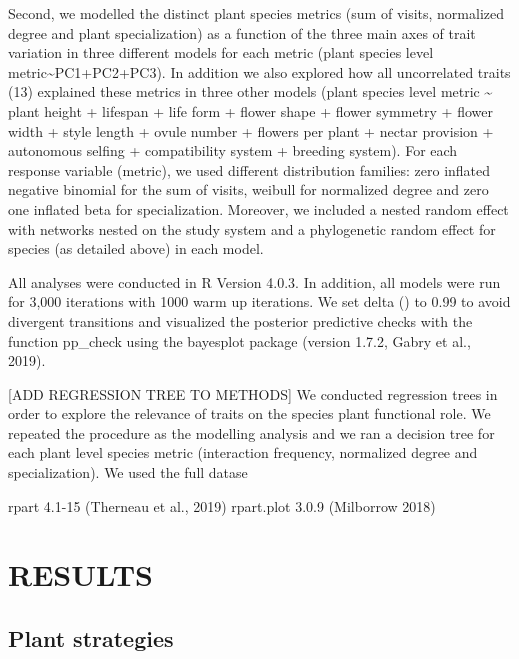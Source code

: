 \documentclass[12pt,a4paper,]{article}
\begin{document}
Second, we modelled the distinct plant species metrics (sum of visits,
normalized degree and plant specialization) as a function of the three
main axes of trait variation in three different models for each metric
(plant species level metric\textasciitilde{}PC1+PC2+PC3). In addition we
also explored how all uncorrelated traits (13) explained these metrics
in three other models (plant species level metric \textasciitilde{}
plant height + lifespan + life form + flower shape + flower symmetry +
flower width + style length + ovule number + flowers per plant + nectar
provision + autonomous selfing + compatibility system + breeding
system). For each response variable (metric), we used different
distribution families: zero inflated negative binomial for the sum of
visits, weibull for normalized degree and zero one inflated beta for
specialization. Moreover, we included a nested random effect with
networks nested on the study system and a phylogenetic random effect for
species (as detailed above) in each model.

All analyses were conducted in R Version 4.0.3. In addition, all models
were run for 3,000 iterations with 1000 warm up iterations. We set delta
() to 0.99 to avoid divergent transitions and visualized the posterior
predictive checks with the function pp\_check using the bayesplot
package (version 1.7.2, Gabry et al., 2019).

{[}ADD REGRESSION TREE TO METHODS{]} We conducted regression trees in
order to explore the relevance of traits on the species plant functional
role. We repeated the procedure as the modelling analysis and we ran a
decision tree for each plant level species metric (interaction
frequency, normalized degree and specialization). We used the full
datase

rpart 4.1-15 (Therneau et al., 2019) rpart.plot 3.0.9 (Milborrow 2018)

\section{RESULTS}\label{results-1}

\subsection{Plant strategies}\label{plant-strategies-1}
\end{document}
